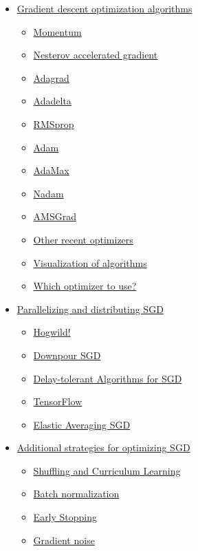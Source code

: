 \documentclass[4pt,journal,compsoc]{IEEEtran}
\begin{document}
\begin{flushleft}
\begin{itemize}
        \item \underline{Gradient descent optimization algorithms}
        \begin{itemize}
            \item \underline{Momentum}
            \item \underline{Nesterov accelerated gradient}
            \item \underline{Adagrad}
            \item \underline{Adadelta}
            \item \underline{RMSprop}
            \item \underline{Adam}
            \item \underline{AdaMax}
            \item \underline{Nadam}
            \item \underline{AMSGrad}
            \item \underline{Other recent optimizers}
            \item \underline{Visualization of algorithms}
            \item \underline{Which optimizer to use?}

        \end{itemize}
        
        \item \underline{Parallelizing and distributing SGD}
        \begin{itemize}
            \item \underline{Hogwild!}
            \item \underline{Downpour SGD}
            \item \underline{Delay-tolerant Algorithms for SGD}
            \item \underline{TensorFlow}
            \item \underline{Elastic Averaging SGD}
        \end{itemize}
        
        \item \underline{Additional strategies for optimizing SGD}
        \begin{itemize}
            \item \underline{Shuffling and Curriculum Learning}
            \item \underline{Batch normalization}
            \item \underline{Early Stopping}
            \item \underline{Gradient noise}
        \end{itemize}
        

\end{itemize}
\end{flushleft}
\end{document}

